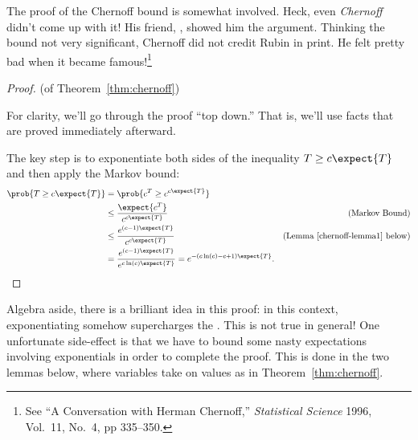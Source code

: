 The proof of the Chernoff bound is somewhat involved.  Heck, even
\emph{Chernoff} didn't come up with it!  His friend, , showed him the argument.  Thinking the bound not very
significant, Chernoff did not credit Rubin in print.  He felt pretty
bad when it became famous!\footnote{See ``A Conversation with Herman
  Chernoff,'' \emph{Statistical Science} 1996, Vol.~11, No.~4, pp
  335--350.}

\iffalse

Here is the theorem again, for reference:

\begin{theorem}[\idx{Chernoff Bound}]
Let $T_1, \dots, T_n$ be mutually independent random variables such
that $0 \leq T_i \leq 1$ for all $i$.  Let $T = T_1 + \cdots + T_n$.
Then for all $c \geq 1$,
\begin{equation}
\prob{T \geq c \expect{T}} \leq e^{-k \expect{T}}
\tag{\ref{chernoff-leq}}
\end{equation}
where $\beta(c) \eqdef c \ln(c) - c + 1$.
\end{theorem}
\fi

\begin{proof} (of Theorem~\ref{thm:chernoff})

For clarity, we'll go through the proof ``top down.''  That is, we'll
use facts that are proved immediately afterward.

The key step is to exponentiate both sides of the inequality $T \ge c
\expect{T}$ and then apply the Markov bound:
\begingroup
\openup\jot
\begin{align*}
\prob{T \geq c \expect{T}} & = \prob{c^T \geq c^{c \expect{T}}} \\
  & \leq \frac{\expect{c^T}}{c^{c \expect{T}}} & \text{(Markov Bound)}\\
  & \leq \frac{e^{(c-1) \expect{T}}}{c^{c \expect{T}}}
         & \text{(Lemma~\ref{chernoff-lemma1} below)}\\
  & = \frac{e^{(c-1) \expect{T}}}{e^{c \ln(c) \expect{T}}} = e^{- (c \ln(c) - c + 1) \expect{T}}.
\end{align*}
\endgroup
\end{proof}

Algebra aside, there is a brilliant idea in this proof: in this
context, exponentiating somehow supercharges the .
This is not true in general!  One unfortunate side-effect is that we
have to bound some nasty expectations involving exponentials in order
to complete the proof.  This is done in the two lemmas below, where
variables take on values as in Theorem~\ref{thm:chernoff}.

